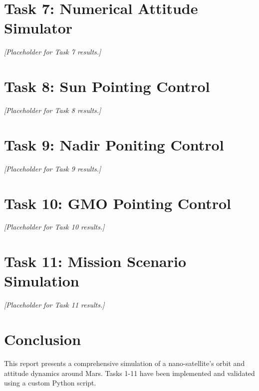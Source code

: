 \documentclass[conf]{article}
\begin{document}
\section{Task 7: Numerical Attitude Simulator}
\vspace{1em}
\textit{[Placeholder for Task 7 results.]}

\section{Task 8: Sun Pointing Control}
\vspace{1em}
\textit{[Placeholder for Task 8 results.]}

\section{Task 9: Nadir Poniting Control}
\vspace{1em}
\textit{[Placeholder for Task 9 results.]}

\section{Task 10: GMO Pointing Control}
\vspace{1em}
\textit{[Placeholder for Task 10 results.]}

\section{Task 11: Mission Scenario Simulation}
\vspace{1em}
\textit{[Placeholder for Task 11 results.]}

\section{Conclusion}
This report presents a comprehensive simulation of a nano-satellite’s orbit and attitude dynamics around Mars. Tasks 1-11 have been implemented and validated using a custom Python script. 
\end{document}
